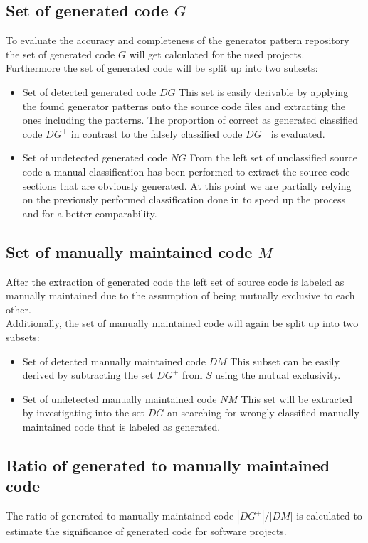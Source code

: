 \subsection{Set of generated code $G$}
To evaluate the accuracy and completeness of the generator pattern repository the set of generated code $G$ will get calculated for the used projects.\\
Furthermore the set of generated code will be split up into two subsets:
\begin{itemize}
	\item Set of detected generated code $DG$
		\subitem This set is easily derivable by applying the found generator patterns onto the source code files and extracting the ones including the patterns. The proportion of correct as generated classified code $DG^+$ in contrast to the falsely classified code $DG^-$ is evaluated.
	\item Set of undetected generated code $NG$
		\subitem From the left set of unclassified source code a manual classification has been performed to extract the source code sections that are obviously generated. At this point we are partially relying on the previously performed classification done in \cite{Bernwieser2014} to speed up the process and for a better comparability.
\end{itemize}

\subsection{Set of manually maintained code $M$}
After the extraction of generated code the left set of source code is labeled as manually maintained due to the assumption of being mutually exclusive to each other.\\
Additionally, the set of manually maintained code will again be split up into two subsets:
\begin{itemize}
	\item Set of detected manually maintained code $DM$
	\subitem This subset can be easily derived by subtracting the set $DG^+$ from $S$ using the mutual exclusivity. 
	\item Set of undetected manually maintained code $NM$
	\subitem This set will be extracted by investigating into the set $DG$ an searching for wrongly classified manually maintained code that is labeled as generated.
\end{itemize}

\subsection{Ratio of generated to manually maintained code}
The ratio of generated to manually maintained code $|DG^+|/|DM|$ is calculated to estimate the significance of generated code for software projects.

